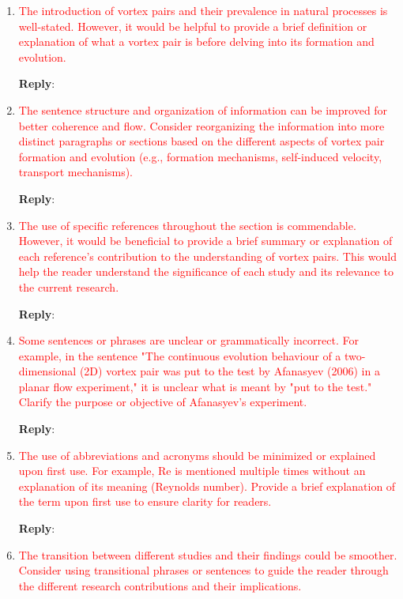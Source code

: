 \documentclass[onecolumn,a4paper,amsmath,amssym,pre]{revtex4}
\begin{document}
{\begin{enumerate}	
	
	\item \textcolor{red}{The introduction of vortex pairs and their prevalence in natural processes is well-stated. However, it would be helpful to provide a brief definition or explanation of what a vortex pair is before delving into its formation and evolution.}
	
\textbf{Reply}:

	\item \textcolor{red}{The sentence structure and organization of information can be improved for better coherence and flow. Consider reorganizing the information into more distinct paragraphs or sections based on the different aspects of vortex pair formation and evolution (e.g., formation mechanisms, self-induced velocity, transport mechanisms).}
	
\textbf{Reply}:

\item \textcolor{red}{The use of specific references throughout the section is commendable. However, it would be beneficial to provide a brief summary or explanation of each reference's contribution to the understanding of vortex pairs. This would help the reader understand the significance of each study and its relevance to the current research.}

\textbf{Reply}:

\item \textcolor{red}{Some sentences or phrases are unclear or grammatically incorrect. For example, in the sentence "The continuous evolution behaviour of a two-dimensional (2D) vortex pair was put to the test by Afanasyev (2006) in a planar flow experiment," it is unclear what is meant by "put to the test." Clarify the purpose or objective of Afanasyev's experiment.}

\textbf{Reply}:

\item \textcolor{red}{The use of abbreviations and acronyms should be minimized or explained upon first use. For example, Re is mentioned multiple times without an explanation of its meaning (Reynolds number). Provide a brief explanation of the term upon first use to ensure clarity for readers.}

\textbf{Reply}:

\item \textcolor{red}{The transition between different studies and their findings could be smoother. Consider using transitional phrases or sentences to guide the reader through the different research contributions and their implications.}


\end{enumerate}}
\end{document}
